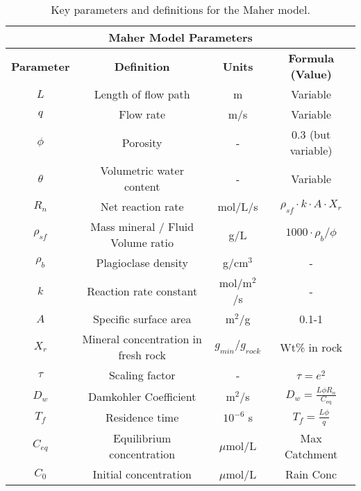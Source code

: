 \begin{tcolorbox}
{\begin{table}[H]
    \centering
    \begin{tabular}{|c|c|c|c|}
        \hline  %
        \multicolumn{4}{|c|}{\textbf{Maher Model Parameters}} \\  
        \hline
        \textbf{Parameter} & \textbf{Definition} & \textbf{Units} & \textbf{Formula (Value)} \\  
        $L$ & Length of flow path & m & Variable \\
        $q$ & Flow rate & m/s & Variable \\
        $\phi$ & Porosity & - & 0.3 (but variable) \\
        $\theta$ & Volumetric water content & - & Variable \\
        $R_n$ & Net reaction rate & mol/L/s & $\rho_{sf} \cdot k \cdot A \cdot X_r $ \\
        $\rho_{sf}$ & Mass mineral / Fluid Volume ratio & g/L & $1000 \cdot \rho_b / \phi$ \\
        $\rho_b$ & Plagioclase density & g/cm$^3$ & - \\
        $k$ & Reaction rate constant & mol/m$^2$/s & - \\
        $A$ & Specific surface area & m$^2$/g & 0.1-1 \\
        $X_r$ & Mineral concentration in fresh rock & $g_{min}/g_{rock}$& Wt\% in rock \\
        $\tau$ & Scaling factor & - & $\tau = e^2$ \\
        $D_w$ & Damkohler Coefficient & m$^2$/s & $D_w = \frac{L \phi R_n}{C_{\text{eq}}}$ \\
        $T_f$ & Residence time & $10^{-6}$ s & $T_f = \frac{L \phi}{q}$ \\
        $C_{eq}$ & Equilibrium concentration & $\mu$mol/L & Max Catchment \\
        $C_0$ & Initial concentration & $\mu$mol/L & Rain Conc \\
        \hline
    \end{tabular}
    \caption{Key parameters and definitions for the Maher model.}
    \label{tab:parameters2}
\end{table}

\FloatBarrier

}

\end{tcolorbox}



